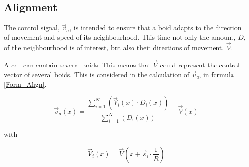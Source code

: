 \documentclass[a4paper, 10pt, journal]{wissarbIEEE}      %
\begin{document}
\subsection{Alignment}
\label{subsec_Ausrichtung}


The control signal, $\vec{v}_a$, is intended to ensure that a boid adapts to the direction of movement and speed of its neighbourhood. This time not only the amount, $D$, of the neighbourhood is of interest, but also their directions of movement, $\vec{V}$. 




 

A cell can contain several boids. This means that $\vec{V}$ could represent the control vector of several boids. This is considered in the calculation of $\vec{v}_a$, in formula \ref{Form_Align}.


\begin{equation}
\vec{v}_a(x) = \dfrac{\sum_{i=1}^N(\vec{V}_i(x) \cdot D_i(x))}{\sum_{i=1}^N(D_i(x))} - \vec{V}(x)
\label{Form_Align}
\end{equation}

with

\begin{equation}
\vec{V}_i(x) = \vec{V}(x + \vec{s}_i \cdot \dfrac{1}{R})
\label{Form_Vi}
\end{equation}

\end{document}
